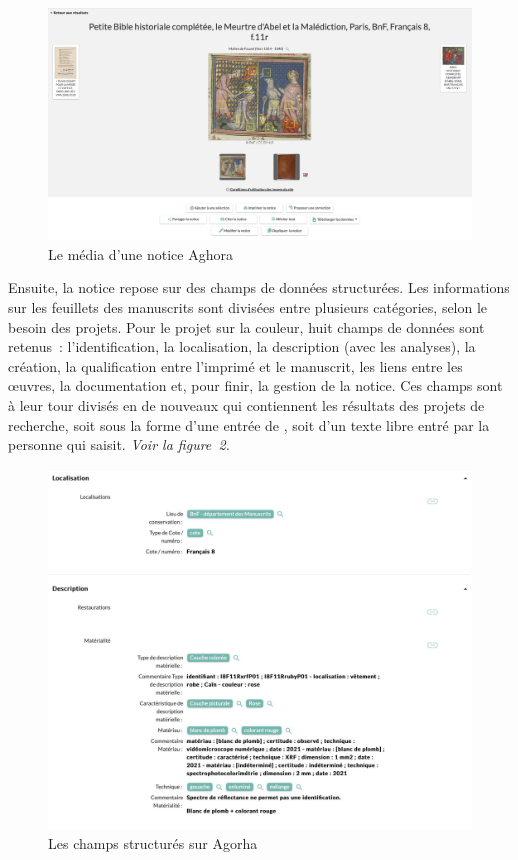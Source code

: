 \begin{figure}[p]
	\centering
	\includegraphics[width=\textwidth]{./textes/chap1/agorha-carrousel.jpg}
	\caption{Le média d'une notice Aghora}
	\label{fig:carrousel}
\end{figure}

Ensuite, la notice repose sur des champs de données structurées. Les informations sur les feuillets des manuscrits sont divisées entre plusieurs catégories, selon le besoin des projets. Pour le projet sur la couleur, huit champs de données sont retenus : l’identification, la localisation, la description (avec les analyses), la création, la qualification entre l’imprimé et le manuscrit, les liens entre les œuvres, la documentation et, pour finir, la gestion de la notice. Ces champs sont à leur tour divisés en de nouveaux qui contiennent les résultats des projets de recherche, soit sous la forme d’une entrée de , soit d’un texte libre entré par la personne qui saisit. \textit{Voir la figure~2.}\par

\begin{figure}[p]
	\centering
	\includegraphics[width=\textwidth]{./textes/chap1/agorha-info.jpg}
	\caption{Les champs structurés sur Agorha}
	\label{fig:info}
\end{figure}

